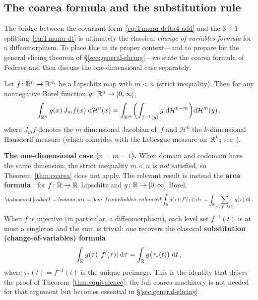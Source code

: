 \subsection{The coarea formula and the substitution rule}%
\label{sec:coarea}

The bridge between the covariant
form~\eqref{eq:Tmunu-delta4-add} and the $3{+}1$
splitting~\eqref{eq:Tmunu-dt} is ultimately the classical
\emph{change-of-variables formula} for a diffeomorphism.  To place
this in its proper context---and to prepare for the general slicing
theorem of \S\ref{sec:general-slicing}---we state the coarea formula
of Federer and then discuss the one-dimensional case separately.

\begin{theorem}%
\label{thm:coarea}
  Let $f\colon \mathbb{R}^{n} \to \mathbb{R}^{m}$ be a Lipschitz map with
  $m < n$ (strict inequality).  Then for any nonnegative Borel
  function $g\colon \mathbb{R}^{n} \to [0,\infty]$,
  \begin{equation}\label{eq:coarea-general}
    \int_{\mathbb{R}^{n}} g(x)\,J_m f(x)\;\mathrm{d}\mathcal{H}^n(x)
      = \int_{\mathbb{R}^{m}}
        \biggl(\int_{f^{-1}(y)}
          g\;\mathrm{d}\mathcal{H}^{n-m}\biggr)
        \mathrm{d}\mathcal{H}^m(y)\,,
  \end{equation}
  where $J_m f$ denotes the $m$-dimensional Jacobian of~$f$
  and $\mathcal{H}^k$ the $k$-dimensional Hausdorff measure
  (which coincides with the Lebesgue measure on~$\mathbb{R}^{k}$;
  see~\cite[2.10.35]{Federer69}).
\end{theorem}

\noindent
\textbf{The one-dimensional case ($n = m = 1$).}\enspace
When domain and codomain have the same dimension, the strict
inequality $m < n$ is \emph{not} satisfied, so
Theorem~\ref{thm:coarea} does not apply.  The relevant result is
instead the \textbf{area formula}
\cite[Theorem~3.2.3]{Federer69}: for $f\colon \mathbb{R} \to \mathbb{R}$
Lipschitz and $g\colon \mathbb{R} \to [0,\infty]$ Borel,
\begin{equation}\label{eq:area-1d}
  \eqbox{
  \int_{\R} g(\tau)\,|f'(\tau)|\;\dd\tau
    = \int_{\R}
      \sum_{\tau\in f^{-1}(t)} g(\tau)\;\dd t}\,.
\end{equation}
When $f$ is injective (in particular, a diffeomorphism), each level
set $f^{-1}(t)$ is at most a singleton and the sum is trivial: one
recovers the classical \textbf{substitution (change-of-variables)
formula}
\begin{equation}\label{eq:substitution}
  \int_{\mathbb{R}} g(\tau)\,|f'(\tau)|\;\mathrm{d}\tau
    = \int_{\mathbb{R}} g\bigl(\tau_\ast(t)\bigr)\;\mathrm{d} t\,,
\end{equation}
where $\tau_\ast(t) = f^{-1}(t)$ is the unique preimage.  This is
the identity that drives the proof of
Theorem~\ref{thm:equivalence}; the full coarea machinery is not
needed for that argument but becomes essential in
\S\ref{sec:general-slicing}.

